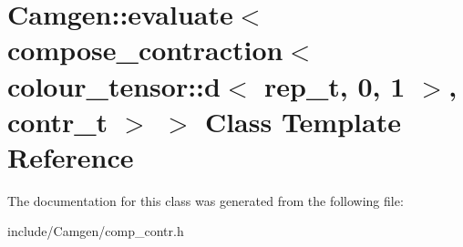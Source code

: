 \hypertarget{a00151}{\section{Camgen\-:\-:evaluate$<$ compose\-\_\-contraction$<$ colour\-\_\-tensor\-:\-:d$<$ rep\-\_\-t, 0, 1 $>$, contr\-\_\-t $>$ $>$ Class Template Reference}
\label{a00151}
}


The documentation for this class was generated from the following file\-:\begin{DoxyCompactItemize}
\item 
include/\-Camgen/comp\-\_\-contr.\-h\end{DoxyCompactItemize}
